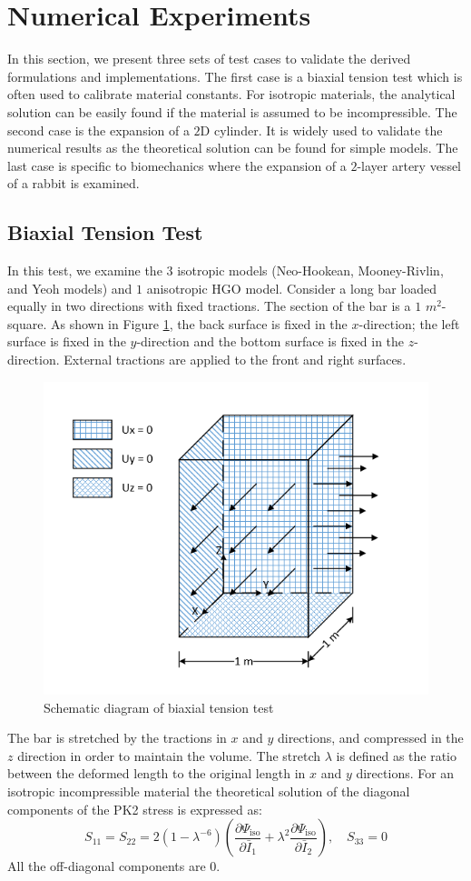 \section{Numerical Experiments}
\label{experiments}
In this section, we present three sets of test cases to validate the derived formulations and implementations. The first case is a biaxial tension test which is often used to calibrate material constants. For isotropic materials, the analytical solution can be easily found if the material is assumed to be incompressible. The second case is the expansion of a $2$D cylinder. It is widely used to validate the numerical results as the theoretical solution can be found for simple models. The last case is specific to biomechanics where the expansion of a $2$-layer artery vessel of a rabbit is examined.

\subsection{Biaxial Tension Test}
\label{biaxial_tension_test}
In this test, we examine the $3$ isotropic models (Neo-Hookean, Mooney-Rivlin, and Yeoh models) and $1$ anisotropic HGO model. Consider a long bar loaded equally in two directions with fixed tractions. The section of the bar is a $1$ $m^2$-square. As shown in Figure \ref{fig:biaxial_schematic}, the back surface is fixed in the $x$-direction; the left surface is fixed in the $y$-direction and the bottom surface is fixed in the $z$-direction. External tractions are applied to the front and right surfaces. 

\begin{figure}[H]
\centering
\includegraphics[width=.5\textwidth]{./figures/biaxial_schematic.png}
\caption{Schematic diagram of biaxial tension test}
\label{fig:biaxial_schematic}
\end{figure}

The bar is stretched by the tractions in $x$ and $y$ directions, and compressed in the $z$ direction in order to maintain the volume. The stretch $\lambda$ is defined as the ratio between the deformed length to the original length in $x$ and $y$ directions. For an isotropic incompressible material the theoretical solution of the diagonal components of the PK2 stress is expressed as:
\begin{equation} \label{biaxialPK2}
S_{11} = S_{22} = 2(1 - {\lambda}^{-6})\left(\frac{\partial\Psi_\mathrm{iso}}{\partial\bar{I}_1} + {\lambda}^2\frac{\partial\Psi_\mathrm{iso}}{\partial\bar{I}_2}\right), \quad S_{33} = 0
\end{equation}
All the off-diagonal components are $0$.

